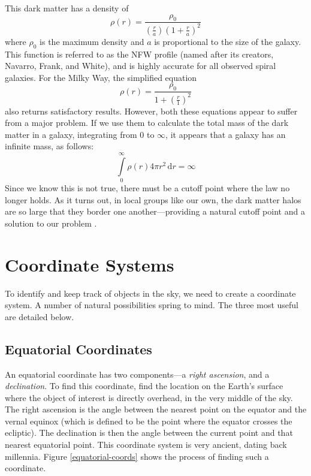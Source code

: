 \documentclass[12pt,twoside]{reedthesis}
\begin{document}
This dark matter has a density of
\begin{equation}
    \rho(r) = \frac{\rho_0}{\left(\frac{r}{a}\right)\left(1+\frac{r}{a}\right)^2}
\end{equation}
where $\rho_0$ is the maximum density and $a$ is proportional to the size of the galaxy. This function is referred to as the NFW profile (named after its creators, Navarro, Frank, and White), and is highly accurate for all observed spiral galaxies. For the Milky Way, the simplified equation
\begin{equation}
    \rho(r) = \frac{\rho_0}{1+\left(\frac{r}{1}\right)^2}
\end{equation}
also returns satisfactory results. However, both these equations appear to suffer from a major problem. If we use them to calculate the total mass of the dark matter in a galaxy, integrating from 0 to $\infty$, it appears that a galaxy has an infinite mass, as follows:
\begin{equation}
    \int\limits_{0}^{\infty} \rho(r) 4 \pi r^2 \, \text{d}r = \infty
\end{equation}
Since we know this is not true, there must be a cutoff point where the law no longer holds. As it turns out, in local groups like our own, the dark matter halos are so large that they border one another---providing a natural cutoff point and a solution to our problem \citep[pp. 196]{galaxies-in-universe}.

\section*{Coordinate Systems}

To identify and keep track of objects in the sky, we need to create a coordinate system. A number of natural possibilities spring to mind. The three most useful are detailed below.

\subsection*{Equatorial Coordinates}

An equatorial coordinate has two components---a \emph{right ascension}, and a \emph{declination}. To find this coordinate, find the location on the Earth's surface where the object of interest is directly overhead, in the very middle of the sky. The right ascension is the angle between the nearest point on the equator and the vernal equinox (which is defined to be the point where the equator crosses the ecliptic). The declination is then the angle between the current point and that nearest equatorial point. This coordinate system is very ancient, dating back millennia. Figure \ref{equatorial-coords} shows the process of finding such a coordinate.
\end{document}
